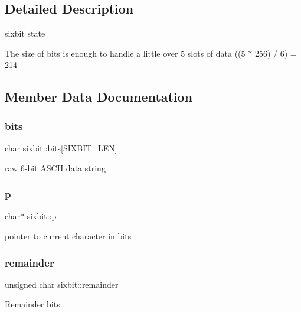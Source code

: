 \subsection{Detailed Description}
sixbit state

The size of bits is enough to handle a little over 5 slots of data ((5 $\ast$ 256) / 6) = 214 

\subsection{Member Data Documentation}
\mbox{\label{structsixbit_a1e67b3ecd6e03edbd1696fc1f4fea185}} 
\subsubsection{\texorpdfstring{bits}{bits}}
{\footnotesize\ttfamily char sixbit\+::bits\mbox{[}\mbox{\hyperlink{sixbit_8h_a3a8670b3483f4813642412fac44d1c0b}{S\+I\+X\+B\+I\+T\+\_\+\+L\+EN}}\mbox{]}}



raw 6-\/bit A\+S\+C\+II data string 

\mbox{\label{structsixbit_a59c600e66f61778c74acac424a75d48e}} 
\subsubsection{\texorpdfstring{p}{p}}
{\footnotesize\ttfamily char$\ast$ sixbit\+::p}



pointer to current character in bits 

\mbox{\label{structsixbit_a8960c5f633f7591019c7c0101a7faf47}} 
\subsubsection{\texorpdfstring{remainder}{remainder}}
{\footnotesize\ttfamily unsigned char sixbit\+::remainder}



Remainder bits. 

\mbox{\label{structsixbit_ac9d104dae7c7f24fe883155e26a47714}} 
